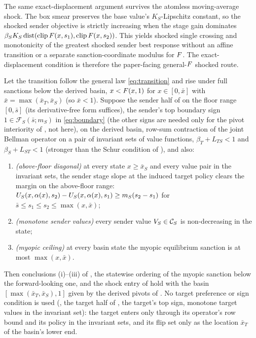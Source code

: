 The same exact-displacement argument survives the atomless moving-average
shock.  The box smear preserves the base value's $K_S$-Lipschitz
constant, so the shocked sender objective is strictly increasing when
the stage gain dominates
$\beta_S K_S\operatorname{dist}(\operatorname{clip}F(x,s_1),
\operatorname{clip}F(x,s_2))$.  This yields shocked single crossing
and monotonicity of the greatest shocked sender best response without
an affine transition or a separate sanction-coordinate modulus for
$F$.  The exact-displacement condition is therefore the paper-facing
general-$F$ shocked route.

\begin{proposition}
\label{prop:flip-route}
Let the transition follow the general law \eqref{eq:transition} and rise
under full sanctions below the derived basin, $x<F(x,1)$ for
$x\in[0,\bar x]$ with $\bar x=\max(\bar x_T,\bar x_S)$ (so $\bar x<1$).
Suppose the sender half of  on the floor range $[0,\bar s]$
(its derivative-free form suffices), the sender's top boundary sign
$1\in\mathcal F_S(\bar s;m_S)$ in \eqref{eq:boundary} (the other signs are
needed only for the pivot interiority of , not here),
 on the derived basin, row-sum contraction of the joint
Bellman operator on a pair of invariant sets of value functions, $\beta_T+L_{TS}<1$ and
$\beta_S+L_{ST}<1$ (stronger than the Schur condition of ),
and also:
\begin{enumerate}[label=(\roman*)]
\item \emph{(above-floor diagonal)} at every state $x\ge\bar x_S$ and every
value pair in the invariant sets, the sender stage slope at the induced target policy clears the
margin on the above-floor range:
$U_S(x,\alpha(x),s_2)-U_S(x,\alpha(x),s_1)\ge m_S(s_2-s_1)$ for
$\bar s\le s_1\le s_2\le\max(x,\bar x)$;
\item \emph{(monotone sender values)} every sender value
$V_S\in\mathcal C_S$ is non-decreasing in the state;
\item \emph{(myopic ceiling)} at every basin state the myopic equilibrium
sanction is at most $\max(x,\bar x)$.
\end{enumerate}
Then conclusions (i)--(iii) of , the statewise
ordering of the myopic sanction below the forward-looking one, and
the shock entry of  hold with the basin
$[\max(\bar x_T,\bar x_S),1]$ given by the derived pivots of
. No target preference or sign condition is used
(, the target half of , the target's top
sign, monotone target values in the invariant set): the target enters only through its
operator's row bound and its policy in the invariant sets, and its flip set only as
the location $\bar x_T$ of the basin's lower end.
\end{proposition}

